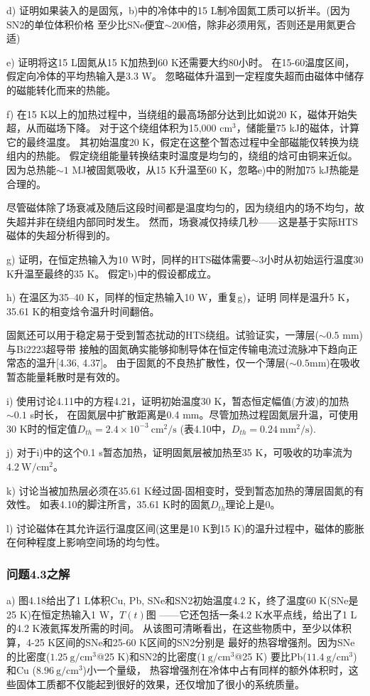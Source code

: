d) 证明如果装入的是固氖，b)中的冷体中的15 L制冷固氮工质可以折半。(因为SN2的单位体积价格
至少比SNe便宜$\sim 200$倍，除非必须用氖，否则还是用氮更合适)


e) 证明将这15 L固氮从15 K加热到60 K还需要大约80小时。
在15-60温度区间，假定向冷体的平均热输入是3.3 W。
忽略磁体升温到一定程度失超而由磁体中储存的磁能转化而来的热能。

f) 在15 K以上的加热过程中，当绕组的最高场部分达到比如说20 K，磁体开始失超，从而磁场下降。
对于这个绕组体积为15,000 $\mathrm{cm^3}$，储能量75 kJ的磁体，计算它的最终温度。
其初始温度20 K，假定在这整个暂态过程中全部磁能仅转换为绕组内的热能。
假定绕组能量转换结束时温度是均匀的，绕组的焓可由铜来近似。
因为总热能$\sim 1$ MJ被固氮吸收，从15 K升温至60 K，忽略e)中的附加75 kJ热能是合理的。

尽管磁体除了场衰减及随后这段时间都是温度均匀的，因为绕组内的场不均匀，故失超并非在绕组内部同时发生。
然而，场衰减仅持续几秒——这是基于实际HTS磁体的失超分析得到的。

g) 证明，在恒定热输入为10 W时，同样的HTS磁体需要$\sim 3$小时从初始运行温度30 K升温至最终的35 K。
假定b)中的假设都成立。

h) 在温区为35–40 K，同样的恒定热输入10 W，重复g)，证明
同样是温升5 K，35.61 K的相变焓令温升时间翻倍。

固氮还可以用于稳定易于受到暂态扰动的HTS绕组。试验证实，一薄层($\sim 0.5$ mm)与Bi2223超导带
接触的固氮确实能够抑制导体在恒定传输电流过流脉冲下趋向正常态的温升[4.36, 4.37]。
由于固氮的不良热扩散性，仅一个薄层($\sim 0.5$mm)在吸收暂态能量耗散时是有效的。

i) 使用讨论4.11中的方程4.21，证明初始温度30 K，暂态恒定幅值(方波)的加热$\sim 0.1$ s时长，
在固氮层中扩散距离是0.4 mm。尽管加热过程固氮层升温，可使用30 K时的恒定值$D_{th}=2.4×10^{−3}\ \mathrm{cm^2/s}$ (表4.10中，$D_{th}=0.24\ \mathrm{mm^2/s}$).


j) 对于i)中的这个0.1 s暂态加热，证明固氮层被加热至35 K，可吸收的功率流为$4.2\ \mathrm{W/cm^2}$。

k) 讨论当被加热层必须在35.61 K经过固-固相变时，受到暂态加热的薄层固氮的有效性。
如表4.10的脚注所言，35.61 K时的固氮$D_{th}$理论上是0。

l) 讨论磁体在其允许运行温度区间(这里是10 K到15 K)的温升过程中，磁体的膨胀在何种程度上影响空间场的均匀性。

\subsubsection{问题4.3之解}
a) 图4.18给出了1 L体积Cu, Pb, SNe和SN2初始温度4.2 K，终了温度60 K(SNe是25 K)在恒定热输入1 W，$T(t)$图
——它还包括一条4.2 K水平点线，给出了1 L的4.2 K液氦挥发所需的时间。
从该图可清晰看出，在这些物质中，至少以体积算，4-25 K区间的SNe和25-60 K区间的SN2分别是
最好的热容增强剂。因为SNe的比密度($1.25\ \mathrm{g/cm^3}$@25 K)和SN2的比密度($1\ \mathrm{g/cm^3}$@25 K)
要比Pb($11.4\ \mathrm{g/cm^3}$)和Cu ($8.96\ \mathrm{g/cm^3}$)小一个量级，
热容增强剂在冷体中占有同样的额外体积时，这些固体工质都不仅能起到很好的效果，还仅增加了很小的系统质量。

